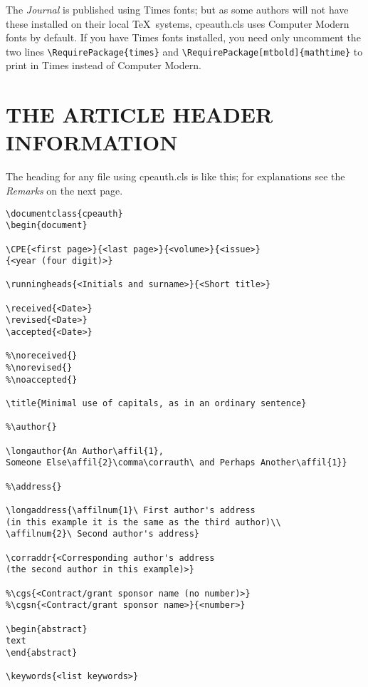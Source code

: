 \documentclass{cpeauth}
\begin{document}
The \emph{Journal} is published using Times fonts; but as some authors
will not have these installed on their local \TeX\ systems,
\textsf{cpeauth.cls} uses Computer Modern fonts by default.
If you have Times fonts installed, you need only uncomment the two lines
\verb"\RequirePackage{times}" and
\verb"\RequirePackage[mtbold]{mathtime}"
to print in Times instead of Computer Modern.

\section{THE ARTICLE HEADER INFORMATION}
The heading for any file using \textsf{cpeauth.cls} is like this;
for explanations see the \textit{Remarks}
on the next page.

\begin{verbatim}
\documentclass{cpeauth}
\begin{document}

\CPE{<first page>}{<last page>}{<volume>}{<issue>}
{<year (four digit)>}

\runningheads{<Initials and surname>}{<Short title>}

\received{<Date>}
\revised{<Date>}
\accepted{<Date>}

%\noreceived{}
%\norevised{}
%\noaccepted{}

\title{Minimal use of capitals, as in an ordinary sentence}

%\author{}

\longauthor{An Author\affil{1},
Someone Else\affil{2}\comma\corrauth\ and Perhaps Another\affil{1}}

%\address{}

\longaddress{\affilnum{1}\ First author's address
(in this example it is the same as the third author)\\
\affilnum{2}\ Second author's address}

\corraddr{<Corresponding author's address
(the second author in this example)>}

%\cgs{<Contract/grant sponsor name (no number)>}
%\cgsn{<Contract/grant sponsor name>}{<number>}

\begin{abstract}
text
\end{abstract}

\keywords{<list keywords>}
\end{verbatim}
\end{document}
